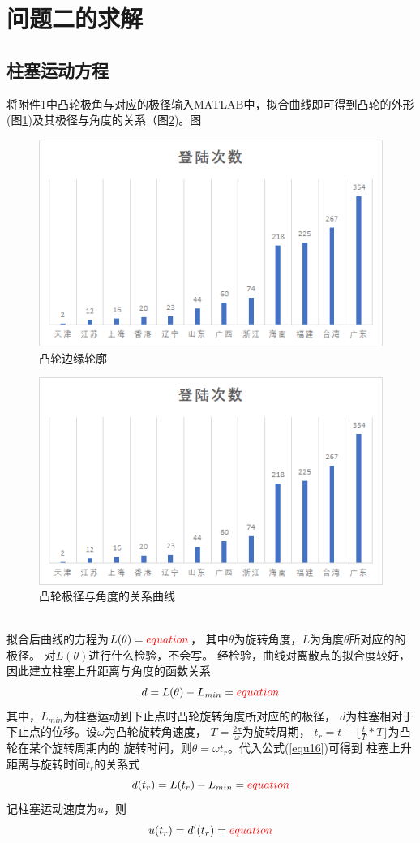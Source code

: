 \documentclass[withoutpreface,bwprint]{cumcmthesis} %
\begin{document}
\section{问题二的求解}
\subsection{柱塞运动方程}
    将附件1中凸轮极角与对应的极径输入MATLAB中，拟合曲线即可得到凸轮的外形
    (图\ref{figure9})及其极径与角度的关系（图\ref{figure10})。{\color{red}图}
    \begin{figure}[!h]
        \centering
        \includegraphics[width=.6\textwidth]{1949-2018_province_occurence.png}
        \caption{凸轮边缘轮廓}
        \label{figure9}
    \end{figure}
    \begin{figure}[!h]
        \centering
        \includegraphics[width=.6\textwidth]{1949-2018_province_occurence.png}
        \caption{凸轮极径与角度的关系曲线}
        \label{figure10}
    \end{figure}
    \\
    拟合后曲线的方程为$L(\theta)={\color{red}equation}$，
    其中$\theta$为旋转角度，$L$为角度$\theta$所对应的的极径。
    对$L(\theta)$进行{\color{red}什么检验，不会写。}
    经检验，曲线对离散点的拟合度较好，
    因此建立柱塞上升距离与角度的函数关系
    \begin{equation}
        d=L(\theta)-L_{min}={\color{red}equation}
    \label{equ16}
    \end{equation}
    其中，$L_{min}$为柱塞运动到下止点时凸轮旋转角度所对应的的极径，
    $d$为柱塞相对于下止点的位移。设$\omega$为凸轮旋转角速度，
    $T=\frac{2\pi}{\omega}$为旋转周期，
    $t_r=t-\lfloor{\frac{t}{T}*T}\rfloor$为凸轮在某个旋转周期内的
    旋转时间，则$\theta=\omega t_r$。代入公式(\ref{equ16})可得到
    柱塞上升距离与旋转时间$t_r$的关系式
    \begin{equation}
        d(t_r)=L(t_r)-L_{min}={\color{red}equation}
    \label{equ16}
    \end{equation}
    记柱塞运动速度为$u$，则
    \begin{equation}
        u(t_r)=d'(t_r)={\color{red}equation}
    \label{equ17}
    \end{equation}   
\end{document}
